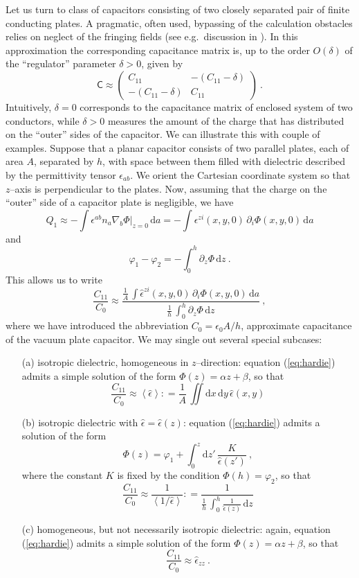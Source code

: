 \documentclass[12pt]{iopart}
\newcommand{\defeq}{\mathrel{\mathop:}=}
\newcommand{\dd}{\partial}
\newcommand{\nab}[1]{\nabla_{\! #1}}
\newcommand{\df}{\mathrm{d}}
\newcommand{\be}{\begin{equation}}
\newcommand{\ee}{\end{equation}}
\newcommand{\mx}[1]{\bm{\mathsf{#1}}}
\newcommand{\0}{\vct{0}}
\theoremstyle{plain} \newtheorem{tm}{Theorem}[section]
\theoremstyle{plain} \newtheorem{lm}[tm]{Lemma}
\theoremstyle{definition} \newtheorem{defn}[tm]{Definition}
\begin{document}
\medskip

Let us turn to class of capacitors consisting of two closely separated pair of finite conducting plates. A pragmatic, often used, bypassing of the calculation obstacles relies on neglect of the fringing fields (see e.g.~discussion in \cite{SBS86}). In this approximation the corresponding capacitance matrix is, up to the order $O(\delta)$ of the ``regulator'' parameter $\delta > 0$, given by
\be
\mx{C} \approx \begin{pmatrix} C_{11} & -(C_{11} - \delta) \\ -(C_{11} - \delta) & C_{11} \end{pmatrix} \ .
\ee
Intuitively, $\delta = 0$ corresponds to the capacitance matrix of enclosed system of two conductors, while $\delta > 0$ measures the amount of the charge that has distributed on the ``outer'' sides of the capacitor. We can illustrate this with couple of examples. Suppose that a planar capacitor consists of two parallel plates, each of area $A$, separated by $h$, with space between them filled with dielectric described by the permittivity tensor $\epsilon_{ab}$. We orient the Cartesian coordinate system so that $z$--axis is perpendicular to the plates. Now, assuming that the charge on the ``outer'' side of a capacitor plate is negligible, we have
\be
Q_1 \approx -\int \epsilon^{ab} n_a \nab{b} \Phi |_{z=0} \, \df a = -\int \epsilon^{zi}(x,y,0) \, \dd_i \Phi(x,y,0) \, \df a
\ee
and
\be
\varphi_1 - \varphi_2 = -\int_0^h \dd_z \Phi \, \df z \ .
\ee
This allows us to write
\be
\frac{C_{11}}{C_0} \approx \frac{\displaystyle{\frac{1}{A} \, \int \hat{\epsilon}^{zi}(x,y,0) \, \dd_i \Phi(x,y,0) \, \df a}}{\displaystyle{\frac{1}{h} \, \int_0^h \dd_z \Phi \, \df z}} \ ,
\ee
where we have introduced the abbreviation $C_0 = \epsilon_0 A/h$, approximate capacitance of the vacuum plate capacitor. We may single out several special subcases:

\begin{itemize}
\item[(a)] isotropic dielectric, homogeneous in $z$--direction: equation (\ref{eq:hardie}) admits a simple solution of the form $\Phi(z) = \alpha z + \beta$, so that
\be
\frac{C_{11}}{C_0} \approx \left< \hat{\epsilon} \right> \defeq \frac{1}{A} \, \iint \df x\,\df y\, \hat{\epsilon}(x,y)
\ee

\item[(b)] isotropic dielectric with $\hat{\epsilon} = \hat{\epsilon}(z)$: equation (\ref{eq:hardie}) admits a solution of the form
\be
\Phi(z) = \varphi_1 + \int_0^z \df z' \, \frac{K}{\hat{\epsilon}(z')} \ ,
\ee
where the constant $K$ is fixed by the condition $\Phi(h) = \varphi_2$, so that
\be
\frac{C_{11}}{C_0} \approx \frac{1}{\left< 1/\hat{\epsilon} \right>} \defeq \frac{1}{\displaystyle{\frac{1}{h} \, \int_0^h \frac{1}{\hat{\epsilon}(z)} \, \df z}}
\ee

\item[(c)] homogeneous, but not necessarily isotropic dielectric: again, equation (\ref{eq:hardie}) admits a simple solution of the form $\Phi(z) = \alpha z + \beta$, so that
\be
\frac{C_{11}}{C_0} \approx \hat{\epsilon}_{zz} \ .
\ee
\end{itemize}
\end{document}
